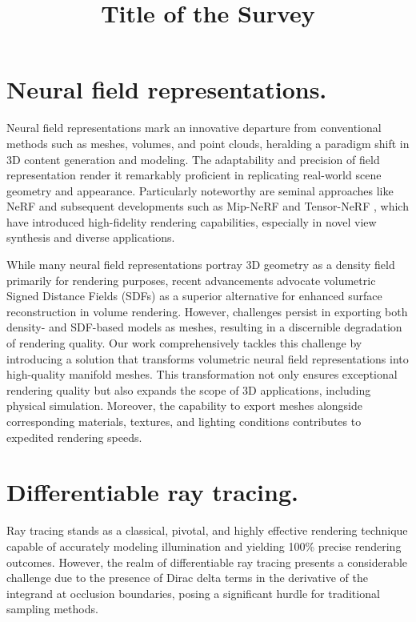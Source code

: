 
\begin{survey}
\label{cha:survey}

\title{Title of the Survey}
\maketitle

\tableofcontents

\section{Neural field representations.} Neural field representations mark an innovative departure from conventional methods such as meshes, volumes, and point clouds, heralding a paradigm shift in 3D content generation and modeling. The adaptability and precision of field representation render it remarkably proficient in replicating real-world scene geometry and appearance. Particularly noteworthy are seminal approaches like NeRF \cite{nerf} and subsequent developments such as Mip-NeRF \cite{mipnerf} and Tensor-NeRF \cite{tensorf}, which have introduced high-fidelity rendering capabilities, especially in novel view synthesis and diverse applications.

While many neural field representations portray 3D geometry as a density field primarily for rendering purposes, recent advancements advocate volumetric Signed Distance Fields (SDFs) as a superior alternative for enhanced surface reconstruction in volume rendering. However, challenges persist in exporting both density- and SDF-based models as meshes, resulting in a discernible degradation of rendering quality. Our work comprehensively tackles this challenge by introducing a solution that transforms volumetric neural field representations into high-quality manifold meshes. This transformation not only ensures exceptional rendering quality but also expands the scope of 3D applications, including physical simulation. Moreover, the capability to export meshes alongside corresponding materials, textures, and lighting conditions contributes to expedited rendering speeds.

\section{Differentiable ray tracing.} Ray tracing stands as a classical, pivotal, and highly effective rendering technique capable of accurately modeling illumination and yielding 100\% precise rendering outcomes. However, the realm of differentiable ray tracing presents a considerable challenge due to the presence of Dirac delta terms in the derivative of the integrand at occlusion boundaries, posing a significant hurdle for traditional sampling methods.


\end{survey}
